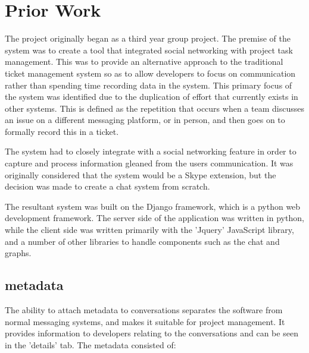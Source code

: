 \documentclass{l4proj}
\begin{document}
\section{Prior Work}

The project originally began as a third year group project.  The premise of the system was to create a tool that integrated social networking with project task management.  This was to provide an alternative approach to the traditional ticket management system so as to allow developers to focus on communication rather than spending time recording data in the system.  This primary focus of the system was identified due to the duplication of effort that currently exists in other systems.  This is defined as the repetition that occurs when a team discusses an issue on a different messaging platform, or in person, and then goes on to formally record this in a ticket.

The system had to closely integrate with a social networking feature in order to capture and process information gleaned from the users communication.  It was originally considered that the system would be a Skype extension, but the decision was made to create a chat system from scratch. 

The resultant system was built on the Django framework, which is a python web development framework.  The server side of the application was written in python, while the client side was written primarily with the 'Jquery' JavaScript library, and a number of other libraries to handle components such as the chat and graphs. 

\subsection{metadata}
The ability to attach metadata to conversations separates the software from normal messaging systems, and makes it suitable for project management.  It provides information to developers relating to the conversations and can be seen in the 'details' tab.  The metadata consisted of:
\end{document}
